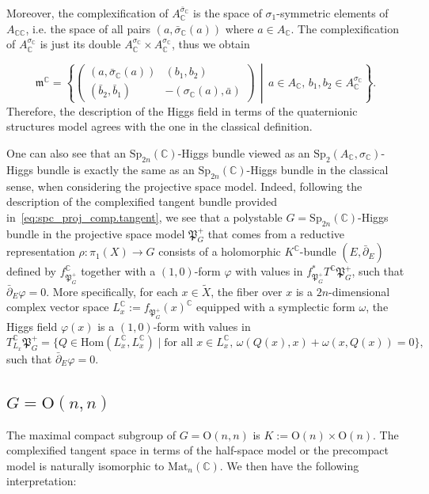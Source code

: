 \documentclass[oneside,11pt]{amsart}
\theoremstyle{definition}
\theoremstyle{remark}
\newcommand{\midwd}{\,\middle\vert\,}
\numberwithin{thm}{section}
\numberwithin{equation}{section}
\begin{document}
Moreover, the complexification of $A^{\bar\sigma_\mathbb C}_{\mathbb{C}}$ is the space of $\sigma_1$-symmetric elements of $A_{\mathbb C\mathbb C}$, i.e. the space of all pairs $(a,\bar\sigma_\mathbb C(a))$ where $a\in A_\mathbb C$. The complexification of $A^{\sigma_\mathbb C}_{\mathbb{C}}$ is just its double $A^{\sigma_\mathbb C}_{\mathbb{C}}\times A^{\sigma_\mathbb C}_{\mathbb{C}}$, thus we obtain

$$\mathfrak m^\mathbb C= \left\{\begin{pmatrix}
(a,\bar\sigma_\mathbb C(a)) & (b_1,b_2)\\
(\bar b_2,\bar b_1) & -(\sigma_\mathbb C(a),\bar a)
\end{pmatrix} \midwd a\in A_\mathbb C,\,b_1,b_2\in A_\mathbb C^{\sigma_\mathbb C}\right\}.$$
Therefore, the description of the Higgs field in terms of the quaternionic structures model agrees with the one in the classical definition.

One can also see that an $\mathrm{Sp}_{2n}(\mathbb{C})$-Higgs bundle viewed as an $\mathrm{Sp}_2(A_{\mathbb{C}}, \sigma_{\mathbb{C}})$-Higgs bundle is exactly the same as an $\mathrm{Sp}_{2n}(\mathbb{C})$-Higgs bundle in the classical sense, when considering the projective space model. Indeed, following the description of the complexified tangent bundle provided in~\eqref{eq:spc_proj_comp.tangent}, we see that a polystable $G=\mathrm{Sp}_{2n}(\mathbb C)$-Higgs bundle in the projective space model $\mathfrak{P}_{G}^+$ that comes from a reductive representation $\rho\colon \pi_1(X)\to G$ consists of a holomorphic $K^\mathbb C$-bundle $(E,\bar\partial_E)$ defined by $f_{\mathfrak{P}_{G}^+}^\mathbb C$ together with a $(1,0)$-form $\varphi$ with values in $f_{\mathfrak{P}_{G}^+}^*T^\mathbb{C}\mathfrak{P}_{G}^+$, such that $\bar\partial_E \varphi =0$. More specifically, for each $x\in \tilde X$, the fiber over $x$ is a $2n$-dimensional complex vector space $L_x^\mathbb C:=f_{\mathfrak{P}_{G}^+}(x)^\mathbb C$ equipped with a symplectic form $\omega$, the Higgs field $\varphi(x)$ is a $(1,0)$-form with values in 
    $$T_{L_x}^\mathbb C\mathfrak{P}_{G}^+=\{Q\in\mathrm{Hom}(L_x^\mathbb C,L_x^\mathbb C)\mid \text{for all $x\in L_x^\mathbb C$, } \omega(Q(x),x)+\omega(x,Q(x))=0\},$$
    such that $\bar\partial_E \varphi =0$.



\subsection{\texorpdfstring{$G=\mathrm{O}(n,n)$}{G=O(n,n)}}
The maximal compact subgroup of $G=\mathrm{O}(n,n)$ is $K:=\mathrm{O}(n)\times\mathrm{O}(n)$. The complexified tangent space in terms of the half-space model or the precompact model is naturally isomorphic to $\mathrm{Mat}_n(\mathbb C)$. We then have the following interpretation:
\end{document}

